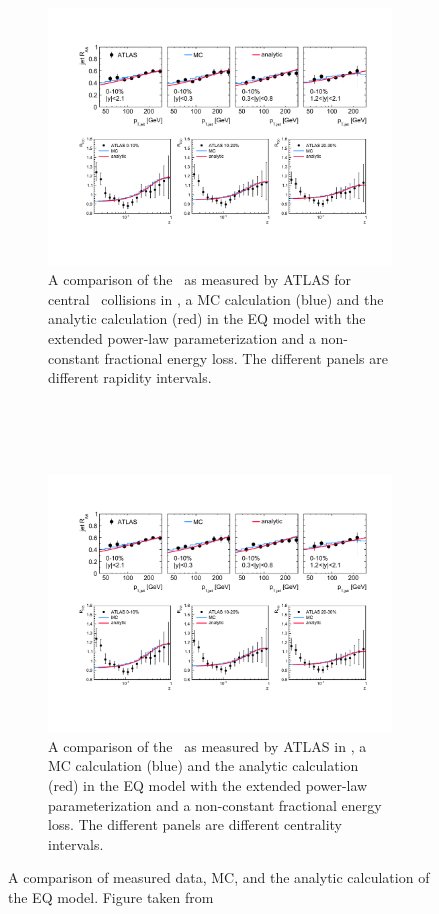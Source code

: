 \begin{figure}
\begin{subfigure}{1\textwidth}
  \centering
\includegraphics[width=1\textwidth]{figures/jetMeasurements/EQ_RAA}
\caption{A comparison of the \RAA\ as measured by ATLAS for central \pbpb\ collisions in \cite{Aad:2014bxa}, a MC calculation (blue) and the analytic calculation (red) in the EQ model with the extended power-law parameterization and a non-constant fractional energy loss. The different panels are different rapidity intervals.}
\label{fig:EQ_RAA}
\end{subfigure} \\ \\ \\
\begin{subfigure}{1\textwidth}
  \centering
\includegraphics[width=1\textwidth]{figures/jetMeasurements/eq_FF}
\caption{A comparison of the \Rdz\ as measured by ATLAS in \cite{Aad:2014wha}, a MC calculation (blue) and the analytic calculation (red) in the EQ model with the extended power-law parameterization and a non-constant fractional energy loss. The different panels are different centrality intervals.}
\label{fig:EQ_FF}
\end{subfigure}
\caption{A comparison of measured data, MC, and the analytic calculation of the EQ model. Figure taken from \cite{Spousta:2015fca}}
\label{fig:EQ_modification}
\end{figure}
